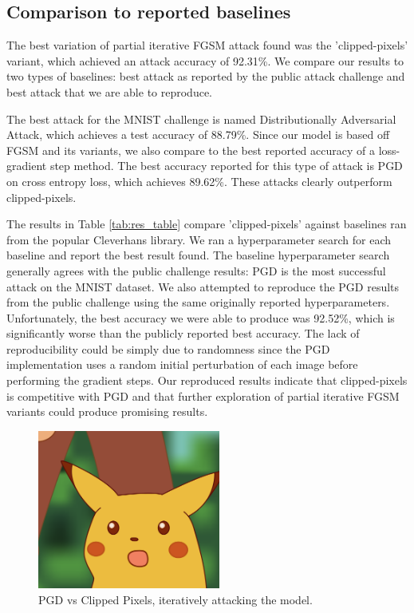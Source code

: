 \subsection{Comparison to reported baselines}
The best variation of partial iterative FGSM attack found was the 'clipped-pixels' variant, which achieved an attack accuracy of 92.31\%. We compare our results to two types of baselines: best attack as reported by the public attack challenge and best attack that we are able to reproduce.

The best attack for the MNIST challenge is named Distributionally Adversarial Attack, which achieves a test accuracy of 88.79\%. Since our model is based off FGSM and its variants, we also compare to the best reported accuracy of a loss-gradient step method. The best accuracy reported for this type of attack is PGD on cross entropy loss, which achieves 89.62\%. These attacks clearly outperform clipped-pixels.

The results in Table \ref{tab:res_table} compare 'clipped-pixels' against baselines ran from the popular Cleverhans library. We ran a hyperparameter search for each baseline and report the best result found. The baseline hyperparameter search generally agrees with the public challenge results: PGD is the most successful attack on the MNIST dataset. We also attempted to reproduce the PGD results from the public challenge using the same originally reported hyperparameters. Unfortunately, the best accuracy we were able to produce was 92.52\%, which is significantly worse than the publicly reported best accuracy. The lack of reproducibility could be simply due to randomness since the PGD implementation uses a random initial perturbation of each image before performing the gradient steps. Our reproduced results indicate that clipped-pixels is competitive with PGD and that further exploration of partial iterative FGSM variants could produce promising results.

\begin{figure}
    \centering
    \includegraphics[width=6cm]{Report/sections/images/pikachu.jpg}
    \caption{PGD vs Clipped Pixels, iteratively attacking the model.}
    \label{fig:PGDvCLIP}
\end{figure}


